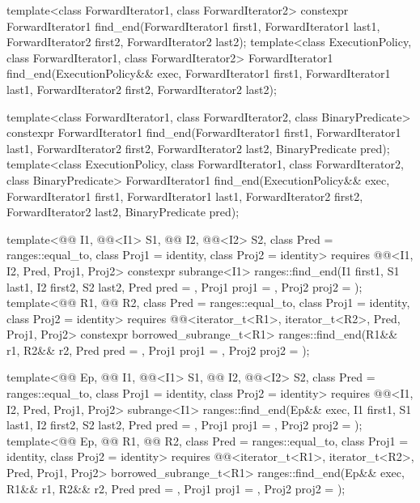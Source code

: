 %
\begin{itemdecl}
template<class ForwardIterator1, class ForwardIterator2>
  constexpr ForwardIterator1
    find_end(ForwardIterator1 first1, ForwardIterator1 last1,
             ForwardIterator2 first2, ForwardIterator2 last2);
template<class ExecutionPolicy, class ForwardIterator1, class ForwardIterator2>
  ForwardIterator1
    find_end(ExecutionPolicy&& exec,
             ForwardIterator1 first1, ForwardIterator1 last1,
             ForwardIterator2 first2, ForwardIterator2 last2);

template<class ForwardIterator1, class ForwardIterator2,
         class BinaryPredicate>
  constexpr ForwardIterator1
    find_end(ForwardIterator1 first1, ForwardIterator1 last1,
             ForwardIterator2 first2, ForwardIterator2 last2,
             BinaryPredicate pred);
template<class ExecutionPolicy, class ForwardIterator1, class ForwardIterator2,
         class BinaryPredicate>
  ForwardIterator1
    find_end(ExecutionPolicy&& exec,
             ForwardIterator1 first1, ForwardIterator1 last1,
             ForwardIterator2 first2, ForwardIterator2 last2,
             BinaryPredicate pred);

template<@@ I1, @@<I1> S1, @@ I2, @@<I2> S2,
         class Pred = ranges::equal_to, class Proj1 = identity, class Proj2 = identity>
  requires @@<I1, I2, Pred, Proj1, Proj2>
  constexpr subrange<I1>
    ranges::find_end(I1 first1, S1 last1, I2 first2, S2 last2, Pred pred = {},
                     Proj1 proj1 = {}, Proj2 proj2 = {});
template<@@ R1, @@ R2,
         class Pred = ranges::equal_to, class Proj1 = identity, class Proj2 = identity>
  requires @@<iterator_t<R1>, iterator_t<R2>, Pred, Proj1, Proj2>
  constexpr borrowed_subrange_t<R1>
    ranges::find_end(R1&& r1, R2&& r2, Pred pred = {},
                     Proj1 proj1 = {}, Proj2 proj2 = {});

template<@@ Ep, @@ I1, @@<I1> S1,
         @@ I2, @@<I2> S2,
         class Pred = ranges::equal_to, class Proj1 = identity, class Proj2 = identity>
  requires @@<I1, I2, Pred, Proj1, Proj2>
  subrange<I1>
    ranges::find_end(Ep&& exec, I1 first1, S1 last1, I2 first2, S2 last2, Pred pred = {},
                     Proj1 proj1 = {}, Proj2 proj2 = {});
template<@@ Ep, @@ R1, @@ R2,
         class Pred = ranges::equal_to, class Proj1 = identity, class Proj2 = identity>
  requires @@<iterator_t<R1>, iterator_t<R2>, Pred, Proj1, Proj2>
  borrowed_subrange_t<R1>
    ranges::find_end(Ep&& exec, R1&& r1, R2&& r2, Pred pred = {},
                     Proj1 proj1 = {}, Proj2 proj2 = {});
\end{itemdecl}

